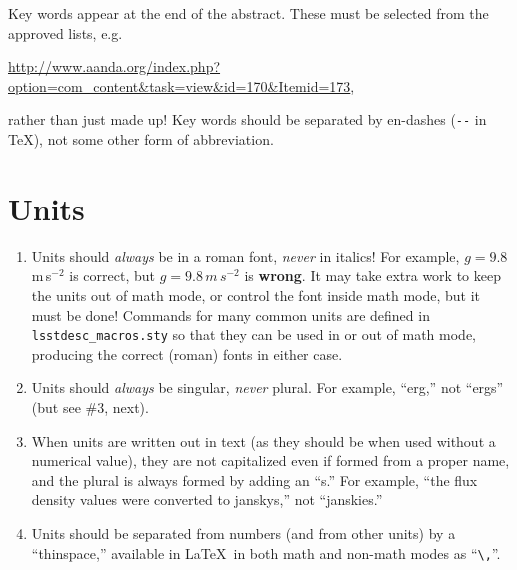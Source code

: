\documentclass[letterpaper,11pt]{article}
\begin{document}
Key words appear at the end of the abstract.  These must be selected from
the approved lists, e.g.

\url{http://www.aanda.org/index.php?option=com_content\&task=view\&id=170\&Itemid=173},

\noindent
rather than just made up!  Key words should be separated by en-dashes (\verb|--| in
\TeX), not some other form of abbreviation.

 

\section{Units}

\begin{enumerate}

\item Units should {\it always\/} be in a roman font, {\it never\/} in
italics!  For example, $g = 9.8$\,m\,s$^{-2}$ is correct,
but $g=9.8\,m\,s^{-2}$ is
{\bf wrong}.  It may take extra work to keep the units out of math mode, or
control the font inside math mode, but it must be done!  Commands for many
common units are defined in {\tt lsstdesc\_macros.sty} so that they can be used in or out of
math mode, producing the correct (roman) fonts in either case.

\item Units should {\it always\/} be singular, {\it never\/} plural.  For
example, ``erg,'' not ``ergs'' (but see \#3, next).

\item When units are written out in text (as they should be when used without
a numerical value), they are not capitalized even if formed from a proper name,
and the plural is always formed by adding an ``s.''  For example, ``the flux
density values were converted to janskys,''  not ``janskies.''



\item Units should be separated from numbers (and from other units) by a
``thinspace,'' available in La\TeX\ in both math and non-math modes as
``\verb|\,|''.


\end{enumerate}
\end{document}

